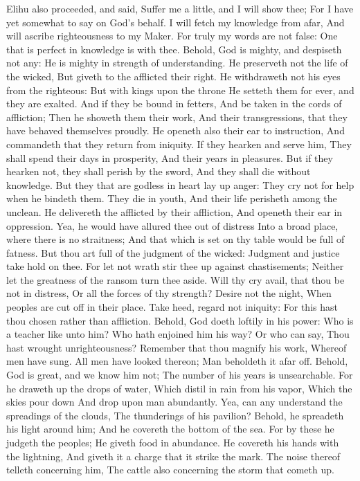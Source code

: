 Elihu also proceeded, and said,  Suffer me a little, and I will show thee; For I have yet somewhat to say on God’s behalf.  I will fetch my knowledge from afar, And will ascribe righteousness to my Maker.  For truly my words are not false: One that is perfect in knowledge is with thee.  Behold, God is mighty, and despiseth not any: He is mighty in strength of understanding.  He preserveth not the life of the wicked, But giveth to the afflicted their right.  He withdraweth not his eyes from the righteous: But with kings upon the throne He setteth them for ever, and they are exalted.  And if they be bound in fetters, And be taken in the cords of affliction;  Then he showeth them their work, And their transgressions, that they have behaved themselves proudly.  He openeth also their ear to instruction, And commandeth that they return from iniquity.  If they hearken and serve him, They shall spend their days in prosperity, And their years in pleasures.  But if they hearken not, they shall perish by the sword, And they shall die without knowledge.  But they that are godless in heart lay up anger: They cry not for help when he bindeth them.  They die in youth, And their life perisheth among the unclean.  He delivereth the afflicted by their affliction, And openeth their ear in oppression.  Yea, he would have allured thee out of distress Into a broad place, where there is no straitness; And that which is set on thy table would be full of fatness.  But thou art full of the judgment of the wicked: Judgment and justice take hold on thee.  For let not wrath stir thee up against chastisements; Neither let the greatness of the ransom turn thee aside.  Will thy cry avail, that thou be not in distress, Or all the forces of thy strength?  Desire not the night, When peoples are cut off in their place.  Take heed, regard not iniquity: For this hast thou chosen rather than affliction.  Behold, God doeth loftily in his power: Who is a teacher like unto him?  Who hath enjoined him his way? Or who can say, Thou hast wrought unrighteousness?  Remember that thou magnify his work, Whereof men have sung.  All men have looked thereon; Man beholdeth it afar off.  Behold, God is great, and we know him not; The number of his years is unsearchable.  For he draweth up the drops of water, Which distil in rain from his vapor,  Which the skies pour down And drop upon man abundantly.  Yea, can any understand the spreadings of the clouds, The thunderings of his pavilion?  Behold, he spreadeth his light around him; And he covereth the bottom of the sea.  For by these he judgeth the peoples; He giveth food in abundance.  He covereth his hands with the lightning, And giveth it a charge that it strike the mark.  The noise thereof telleth concerning him, The cattle also concerning the storm that cometh up. 

